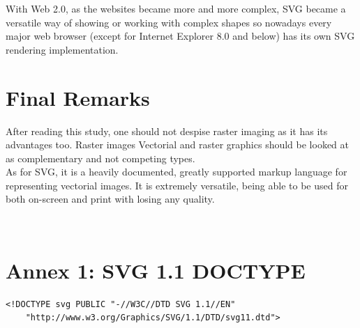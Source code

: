 \documentclass[twocolumn,twoside,10pt,a4paper]{article}
\begin{document}
With Web 2.0, as the websites became more and more complex, SVG became a versatile way of showing or working with complex shapes so nowadays every major web browser (except for Internet Explorer 8.0 and below) has its own SVG rendering implementation.\\


\section{Final Remarks}

After reading this study, one should not despise raster imaging as it has its advantages too. Raster images Vectorial and raster graphics should be looked at as complementary and not competing types.\\

As for SVG, it is a heavily documented, greatly supported markup language for representing vectorial images. It is extremely versatile, being able to be used for both on-screen and print with losing any quality.\\

\renewcommand{\bibname}{References}



\newpage
\ \\
\newpage
\section*{Annex 1: SVG 1.1 DOCTYPE}\label{sec:svg11doctype}
\tiny{
\begin{verbatim}
<!DOCTYPE svg PUBLIC "-//W3C//DTD SVG 1.1//EN"
	"http://www.w3.org/Graphics/SVG/1.1/DTD/svg11.dtd">
\end{verbatim}
}
\end{document}
